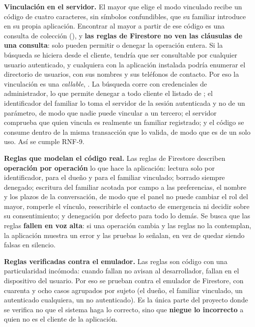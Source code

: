 \textbf{Vinculación en el servidor.} El mayor que elige el modo vinculado recibe un código de cuatro
caracteres, sin símbolos confundibles, que su familiar introduce en su propia aplicación. Encontrar al
mayor a partir de ese código es una consulta de colección (), y
\textbf{las reglas de Firestore no ven las cláusulas de una consulta}: solo pueden permitir o denegar la
operación entera. Si la búsqueda se hiciera desde el cliente,  tendría que ser consultable por
cualquier usuario autenticado, y cualquiera con la aplicación instalada podría enumerar el directorio de
usuarios, con sus nombres y sus teléfonos de contacto. Por eso la vinculación es una \emph{callable},
. La búsqueda corre con credenciales de administrador, lo que permite denegar a todo
cliente el listado de ; el identificador del familiar lo toma el servidor de la sesión
autenticada y no de un parámetro, de modo que nadie puede vincular a un tercero; el servidor comprueba que
quien vincula es realmente un familiar registrado; y el código se consume dentro de la misma transacción que
lo valida, de modo que es de un solo uso. Así se cumple RNF-9.

\textbf{Reglas que modelan el código real.} Las reglas de Firestore describen \textbf{operación por
operación} lo que hace la aplicación: lectura solo por identificador, para el dueño y para el familiar
vinculado; borrado siempre denegado; escritura del familiar acotada por campo a las preferencias, el nombre
y los plazos de la conversación, de modo que el panel no puede cambiar el rol del mayor, romperle el vínculo,
reescribirle el contacto de emergencia ni decidir sobre su consentimiento; y denegación por defecto para
todo lo demás. Se busca que las reglas \textbf{fallen en voz alta}: si una operación cambia y las reglas no
la contemplan, la aplicación muestra un error y las pruebas lo señalan, en vez de quedar siendo falsas en
silencio.

\textbf{Reglas verificadas contra el emulador.} Las reglas son código con una particularidad incómoda:
cuando fallan no avisan al desarrollador, fallan en el dispositivo del usuario. Por eso se prueban contra el
emulador de Firestore, con cuarenta y ocho casos agrupados por sujeto (el dueño, el familiar vinculado, un
autenticado cualquiera, un no autenticado). Es la única parte del proyecto donde se verifica no que el
sistema haga lo correcto, sino que \textbf{niegue lo incorrecto} a quien no es el cliente de la aplicación.

